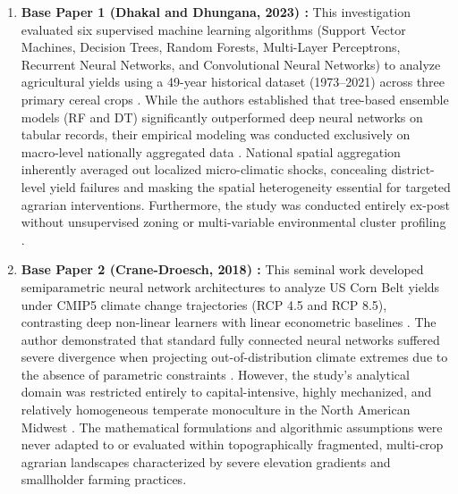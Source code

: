 \documentclass[conference]{IEEEtran}
\begin{document}
\begin{enumerate}
    \item \textbf{Base Paper 1 (Dhakal and Dhungana, 2023) \cite{dhakal2023}:} This investigation evaluated six supervised machine learning algorithms (Support Vector Machines, Decision Trees, Random Forests, Multi-Layer Perceptrons, Recurrent Neural Networks, and Convolutional Neural Networks) to analyze agricultural yields using a 49-year historical dataset (1973--2021) across three primary cereal crops \cite{dhakal2023}. While the authors established that tree-based ensemble models (RF and DT) significantly outperformed deep neural networks on tabular records, their empirical modeling was conducted exclusively on macro-level nationally aggregated data \cite{dhakal2023}. National spatial aggregation inherently averaged out localized micro-climatic shocks, concealing district-level yield failures and masking the spatial heterogeneity essential for targeted agrarian interventions. Furthermore, the study was conducted entirely ex-post without unsupervised zoning or multi-variable environmental cluster profiling \cite{macqueen1967, rousseeuw1987}.
    
    \item \textbf{Base Paper 2 (Crane-Droesch, 2018) \cite{crane2018}:} This seminal work developed semiparametric neural network architectures to analyze US Corn Belt yields under CMIP5 climate change trajectories (RCP 4.5 and RCP 8.5), contrasting deep non-linear learners with linear econometric baselines \cite{crane2018}. The author demonstrated that standard fully connected neural networks suffered severe divergence when projecting out-of-distribution climate extremes due to the absence of parametric constraints \cite{crane2018, schlenker2009}. However, the study's analytical domain was restricted entirely to capital-intensive, highly mechanized, and relatively homogeneous temperate monoculture in the North American Midwest \cite{crane2018}. The mathematical formulations and algorithmic assumptions were never adapted to or evaluated within topographically fragmented, multi-crop agrarian landscapes characterized by severe elevation gradients and smallholder farming practices.
    

\end{enumerate}
\end{document}
